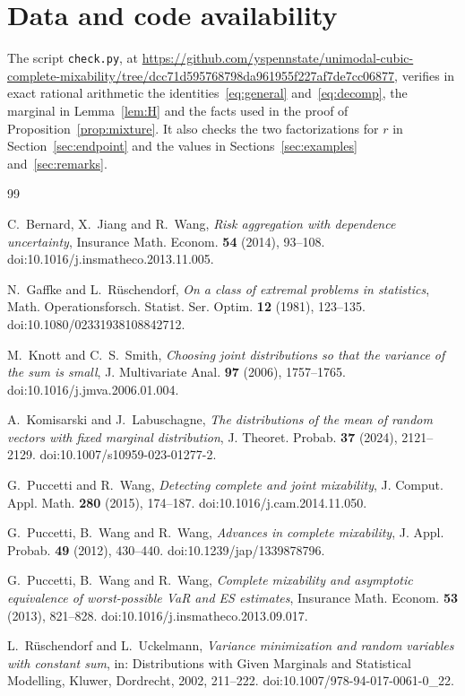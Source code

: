 \documentclass[11pt]{amsart}
\theoremstyle{remark}
\numberwithin{equation}{section}
\begin{document}
\section*{Data and code availability}

The script \texttt{check.py}, at \url{https://github.com/yspennstate/unimodal-cubic-complete-mixability/tree/dcc71d595768798da961955f227af7de7cc06877}, verifies in exact rational arithmetic the identities~\eqref{eq:general} and~\eqref{eq:decomp}, the marginal in Lemma~\ref{lem:H} and the facts used in the proof of Proposition~\ref{prop:mixture}. It also checks the two factorizations for $r$ in Section~\ref{sec:endpoint} and the values in Sections~\ref{sec:examples} and~\ref{sec:remarks}.

\begin{thebibliography}{99}

 C.~Bernard, X.~Jiang and R.~Wang, \emph{Risk aggregation with dependence uncertainty}, Insurance Math. Econom. \textbf{54} (2014), 93--108. doi:10.1016/j.insmatheco.2013.11.005.

 N.~Gaffke and L.~R\"uschendorf, \emph{On a class of extremal problems in statistics}, Math. Operationsforsch. Statist. Ser. Optim. \textbf{12} (1981), 123--135. doi:10.1080/02331938108842712.

 M.~Knott and C.~S.~Smith, \emph{Choosing joint distributions so that the variance of the sum is small}, J. Multivariate Anal. \textbf{97} (2006), 1757--1765. doi:10.1016/j.jmva.2006.01.004.

 A.~Komisarski and J.~Labuschagne, \emph{The distributions of the mean of random vectors with fixed marginal distribution}, J. Theoret. Probab. \textbf{37} (2024), 2121--2129. doi:10.1007/s10959-023-01277-2.

 G.~Puccetti and R.~Wang, \emph{Detecting complete and joint mixability}, J. Comput. Appl. Math. \textbf{280} (2015), 174--187. doi:10.1016/j.cam.2014.11.050.

 G.~Puccetti, B.~Wang and R.~Wang, \emph{Advances in complete mixability}, J. Appl. Probab. \textbf{49} (2012), 430--440. doi:10.1239/jap/1339878796.

 G.~Puccetti, B.~Wang and R.~Wang, \emph{Complete mixability and asymptotic equivalence of worst-possible VaR and ES estimates}, Insurance Math. Econom. \textbf{53} (2013), 821--828. doi:10.1016/j.insmatheco.2013.09.017.

 L.~R\"uschendorf and L.~Uckelmann, \emph{Variance minimization and random variables with constant sum}, in: Distributions with Given Marginals and Statistical Modelling, Kluwer, Dordrecht, 2002, 211--222. doi:10.1007/978-94-017-0061-0\_22.


\end{thebibliography}
\end{document}
